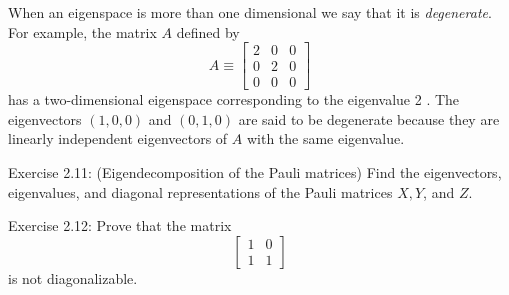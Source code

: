 When an eigenspace is more than one dimensional we say that it is \textit{degenerate}. For example, the matrix $A$ defined by
$$
A \equiv\left[\begin{array}{lll}
2 & 0 & 0 \\
0 & 2 & 0 \\
0 & 0 & 0
\end{array}\right]
$$
has a two-dimensional eigenspace corresponding to the eigenvalue 2 . The eigenvectors $(1,0,0)$ and $(0,1,0)$ are said to be degenerate because they are linearly independent eigenvectors of $A$ with the same eigenvalue.

\begin{exercise}
    Exercise 2.11: (Eigendecomposition of the Pauli matrices) Find the eigenvectors, eigenvalues, and diagonal representations of the Pauli matrices $X, Y$, and $Z$.
\end{exercise}

\begin{exercise}
    Exercise 2.12: Prove that the matrix
$$
\left[\begin{array}{ll}
1 & 0 \\
1 & 1
\end{array}\right]
$$
is not diagonalizable.
\end{exercise}

